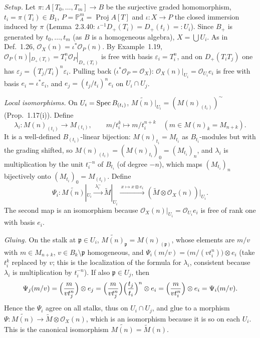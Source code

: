 \documentclass[11pt]{article}
\begin{document}
\pf
\emph{Setup.} Let $\pi:A[T_0,\dots,T_m]\to B$ be the surjective graded homomorphism, $t_i=\pi(T_i)\in B_1$, $P=\mathbb P^m_A=\operatorname{Proj}A[T]$ and $\iota:X\to P$ the closed immersion induced by $\pi$ (Lemma~2.3.40: $\iota^{-1}D_+(T_i)=D_+(t_i)=:U_i$). Since $B_+$ is generated by $t_0,\dots,t_m$ (as $B$ is a homogeneous algebra), $X=\bigcup U_i$. As in Def.~1.26, $\mathcal O_X(n)=\iota^*\mathcal O_P(n)$. By Example~1.19, $\mathcal O_P(n)|_{D_+(T_i)}=T_i^n\mathcal O_P|_{D_+(T_i)}$ is free with basis $\varepsilon_i=T_i^n$, and on $D_+(T_iT_j)$ one has $\varepsilon_j=(T_j/T_i)^n\varepsilon_i$. Pulling back ($\iota^*\mathcal O_P=\mathcal O_X$): $\mathcal O_X(n)|_{U_i}=\mathcal O_{U_i}e_i$ is free with basis $e_i=\iota^*\varepsilon_i$, and $e_j=(t_j/t_i)^ne_i$ on $U_i\cap U_j$.

\emph{Local isomorphisms.} On $U_i=\operatorname{Spec} B_{(t_i)}$, $\widetilde{M(n)}|_{U_i}=(M(n)_{(t_i)})^\sim$ (Prop.~1.17(i)). Define
\[ \lambda_i:M(n)_{(t_i)}\to M_{(t_i)},\qquad m/t_i^k\mapsto m/t_i^{n+k}\quad(m\in M(n)_k=M_{n+k}). \]
It is a well-defined $B_{(t_i)}$-linear bijection: $M(n)_{t_i}=M_{t_i}$ as $B_{t_i}$-modules but with the grading shifted, so $M(n)_{(t_i)}=(M(n)_{t_i})_0=(M_{t_i})_n$, and $\lambda_i$ is multiplication by the unit $t_i^{-n}$ of $B_{t_i}$ (of degree $-n$), which maps $(M_{t_i})_n$ bijectively onto $(M_{t_i})_0=M_{(t_i)}$.
Define
\[ \Psi_i:\widetilde{M(n)}|_{U_i}\xrightarrow{\ \lambda_i^\sim\ }\widetilde M|_{U_i}\xrightarrow{\ x\mapsto x\otimes e_i\ }(\widetilde M\otimes\mathcal O_X(n))|_{U_i}. \]
The second map is an isomorphism because $\mathcal O_X(n)|_{U_i}=\mathcal O_{U_i}e_i$ is free of rank one with basis $e_i$.

\emph{Gluing.} On the stalk at $\mathfrak p\in U_i$, $\widetilde{M(n)}_{\mathfrak p}=M(n)_{(\mathfrak p)}$, whose elements are $m/v$ with $m\in M_{n+k}$, $v\in B_k\setminus\mathfrak p$ homogeneous, and $\Psi_i(m/v)=\bigl(m/(vt_i^n)\bigr)\otimes e_i$ (take $t_i^k$ replaced by $v$; this is the localization of the formula for $\lambda_i$, consistent because $\lambda_i$ is multiplication by $t_i^{-n}$). If also $\mathfrak p\in U_j$, then
\[ \Psi_j(m/v)=\Bigl(\frac m{vt_j^n}\Bigr)\otimes e_j=\Bigl(\frac m{vt_j^n}\Bigr)\Bigl(\frac{t_j}{t_i}\Bigr)^n\otimes e_i=\Bigl(\frac m{vt_i^n}\Bigr)\otimes e_i=\Psi_i(m/v). \]
Hence the $\Psi_i$ agree on all stalks, thus on $U_i\cap U_j$, and glue to a morphism $\Psi:\widetilde{M(n)}\to\widetilde M\otimes\mathcal O_X(n)$, which is an isomorphism because it is so on each $U_i$. This is the canonical isomorphism $\widetilde{M(n)}=\widetilde M(n)$.
\end{document}
